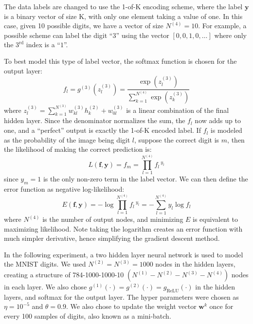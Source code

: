 The data labels are changed to use the 1-of-K encoding scheme,
where the label $\mathbf{y}$ is a binary vector of size K,
with only one element taking a value of one.
In this case, given 10 possible digits,
we have a vector of size $N^{(4)} = 10$.
For example, a possible scheme can label the digit ``$3$'' 
using the vector $[0,0,1,0,\ldots]$ where 
only the $3^\text{rd}$ index is a ``$1$''.

To best model this type of label vector,
the softmax function is chosen for the output layer:
%
\begin{equation}
	f_l = 
	g^{(3)}(z_l^{(3)}) = \frac{\exp(z_l^{(3)})}
		{\sum_{k=1}^{N^{(4)}} \exp(z_k^{(3)})}
\end{equation}
%
where $z^{(3)}_l = \sum_{k=1}^{N^{(3)}} w_{kl}^{(3)} h_k^{(2)} + 
      w^{(3)}_{0l}$ 
      is a linear combination of the final hidden layer.
Since the denominator normalizes the sum, the $f_l$ now adds up to one,
and a ``perfect'' output is exactly the 1-of-K encoded label.
If $f_l$ is modeled as the probability of the image being digit $l$,
suppose the correct digit is $m$,
then the likelihood of making the correct prediction is:
%
\begin{equation}
  L(\mathbf{f},\mathbf{y}) = f_m = \prod_{l=1}^{N^{(4)}} f_l \, ^{y_l}
\end{equation}
%
since $y_m = 1$ is the only non-zero term in the label vector.
We can then define the error function as negative log-likelihood:
%
\begin{equation}
	E(\mathbf{f},\mathbf{y}) 
		= - \log \prod_{l=1}^{N^{(4)}} f_l \, ^{y_l}
		= - \sum_{l=1}^{N^{(4)}} y_l \log f_l
\end{equation}
%
where $N^{(4)}$ is the number of output nodes, 
and minimizing $E$ is equivalent to maximizing likelihood.
Note taking the logarithm creates an error function with much
simpler derivative, 
hence simplifying the gradient descent method.

In the following experiment, 
a two hidden layer neural network is used to model the MNIST digits.
We used $N^{(2)} = N^{(3)} = 1000$ nodes in the hidden layers, 
creating a structure of 784-1000-1000-10 
$\left( N^{(1)} - N^{(2)} - N^{(3)} - N^{(4)} \right)$
nodes in each layer.
We also chose 
$g^{(1)}(\cdot) = g^{(2)}(\cdot) = g_\text{ReLU}(\cdot)$ 
in the hidden layers,
and softmax for the output layer.
The hyper parameters were chosen as $\eta = 10^{-5}$
and $\theta = 0.9$.
We also chose to update the weight vector $\mathbf{w}^k$ once
for every 100 samples of digits,
also known as a mini-batch.

